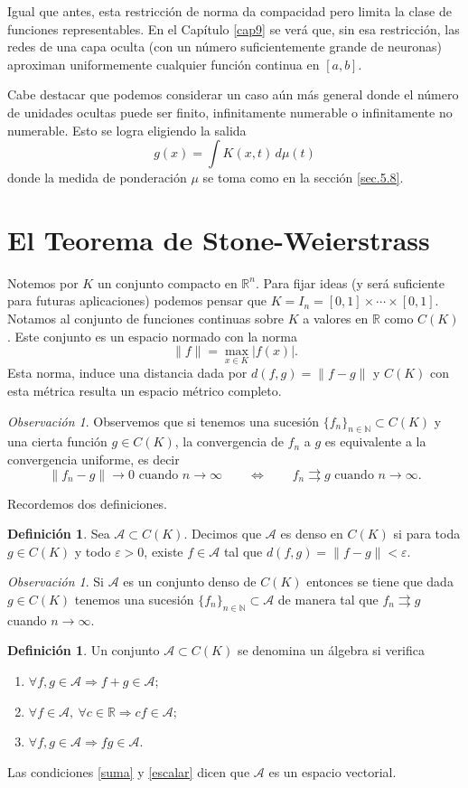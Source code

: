 \documentclass[12pt, a4paper]{amsbook}
\newcommand{\ve}{\varepsilon}
\newcommand{\R}{{\mathbb R}}
\newcommand{\N}{{\mathbb N}}
\newcommand{\A}{{\mathcal A}}
\theoremstyle{remark}
\newtheorem{obs}[teo]{Observaci\'on}
\theoremstyle{definition}
\newtheorem{defi}[teo]{Definici\'on}
\numberwithin{section}{chapter}
\numberwithin{subsection}{section}
\numberwithin{equation}{section}
\numberwithin{figure}{chapter}
\begin{document}
Igual que antes, esta restricción de norma da compacidad pero limita la clase de funciones representables. En el Capítulo \ref{cap9} se verá que, sin esa restricción, las redes de una capa oculta (con un número suficientemente grande de neuronas) aproximan uniformemente cualquier función continua en $[a,b]$.  

Cabe destacar que podemos considerar un caso aún más general donde el número de unidades ocultas puede ser finito, infinitamente numerable o infinitamente no numerable. Esto se logra eligiendo la salida  
$$
g(x) = \int K(x, t)\, d\mu(t)
$$
donde la medida de ponderación $\mu$ se toma como en la sección \ref{sec.5.8}.

\section{El Teorema de Stone-Weierstrass}\label{sec.c7.3}
Notemos por $K$ un conjunto compacto en $\R^n$. Para fijar ideas (y será suficiente para futuras aplicaciones) podemos pensar que $K=I_n = [0, 1]\times\cdots\times[0,1]$. Notamos al conjunto de funciones continuas sobre $K$ a valores en $\R$ como $C(K)$. Este conjunto es un espacio normado con la norma 
$$
\|f\| = \max_{x\in K}|f(x)|.
$$
Esta norma, induce una distancia dada por $d(f, g)=\|f-g\|$ y $C(K)$ con esta métrica resulta un espacio métrico completo.

\begin{obs}
Observemos que si tenemos una sucesión $\{f_n\}_{n\in\N}\subset C(K)$ y una cierta función $g\in C(K)$, la convergencia de $f_n$ a $g$ es equivalente a la convergencia uniforme, es decir
$$
\|f_n-g\|\to 0 \text{ cuando } n\to\infty \qquad \iff \qquad f_n\rightrightarrows g \text{ cuando }n\to\infty.
$$
\end{obs}

Recordemos dos definiciones.
\begin{defi}
Sea $\A\subset C(K)$. Decimos que $\A$ es denso en $C(K)$ si para toda $g\in C(K)$ y todo $\ve>0$, existe $f\in \A$ tal que $d(f, g) = \|f-g\| <\ve$.
\end{defi}

\begin{obs}
Si $\A$ es un conjunto denso de $C(K)$ entonces se tiene que dada $g\in C(K)$ tenemos una sucesión $\{f_n\}_{n\in\N}\subset \A$ de manera tal que $f_n\rightrightarrows g$ cuando $n\to\infty$.
\end{obs}

\begin{defi}
Un conjunto $\A\subset C(K)$ se denomina un álgebra si verifica
\begin{enumerate}
\item $\forall f, g\in \A \Rightarrow f+g\in \A$;\label{suma}
\item $\forall f\in \A,\ \forall c\in\R \Rightarrow cf\in \A$;\label{escalar}
\item $\forall f, g\in \A \Rightarrow fg\in \A$.\label{producto}
\end{enumerate}
\end{defi}
Las condiciones \ref{suma} y \ref{escalar} dicen que $\A$ es un espacio vectorial.
\end{document}
